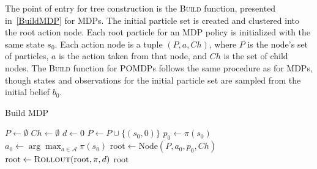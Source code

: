 \documentclass[letterpaper]{article} %
\begin{document}
The point of entry for tree construction is the \textsc{Build} function, presented in~\cref{BuildMDP} for MDPs.
The initial particle set is created and clustered into the root action node.
Each root particle for an MDP policy is initialized with the same state $s_0$. 
Each action node is a tuple $(P, a, Ch)$, where $P$ is the node's set of particles, $a$ is the action taken from that node, and $Ch$ is the set of child nodes. 
The \textsc{Build} function for POMDPs follows the same procedure as for MDPs, though states and observations for the initial particle set are sampled from the initial belief $b_0$.
\begin{algorithm}[htb]
\caption{Build MDP}\label{BuildMDP} 
\begin{algorithmic}[1]
        \State $P \gets \emptyset$
        \State $Ch \gets \emptyset$
        \State $d \gets 0$
            \State $P \gets P \cup \{ (s_0, 0) \}$
        \EndFor
        \State $p_0 \gets \pi(s_0)$
        \State $a_0 \gets \arg\max_{a \in \mathcal{A}} \pi(s_0)$
        \State $\text{root} \gets \text{Node}(P, a_0, p_0, Ch)$
        \State $\text{root} \gets \textsc{Rollout}(\text{root}, \pi, d)$
        \State \Return $\text{root}$
    \EndProcedure
\end{algorithmic}
\end{algorithm}

\end{document}
